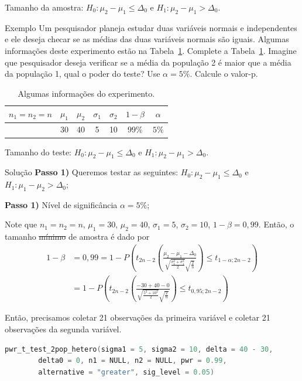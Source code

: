 \documentclass[9pt]{beamer}
\begin{document}
\begin{frame}{Tamanho da amostra: $H_0: \mu_2 - \mu_1 \leq \Delta_0$ e $H_1: \mu_2 - \mu_1 > \Delta_0.$}

\begin{block}{Exemplo}
	Um pesquisador planeja estudar duas variáveis normais e independentes e ele deseja checar se as médias das duas variáveis normais são iguais. Algumas informações deste experimento estão na Tabela~\ref{tab:experimento-h1-upper-sample-size}. Complete a Tabela~\ref{tab:experimento-h1-upper-sample-size}. Imagine que pesquisador deseja verificar se a média da população 2 é maior que a média da população 1, qual o poder do teste? Use $\alpha=5\%$. Calcule o valor-p.
\end{block}

\begin{table}[htbp]
	\centering
	\begin{tabular}{c|c|c|c|c|c|c}
		\toprule[0.05cm]
		$n_1=n_2=n$ & $\mu_1$ & $\mu_2$ & $\sigma_1$ & $\sigma_2$ & $1-\beta$ & $\alpha$ \\ \midrule[0.025cm]
		 & 30 & 40 & 5 & 10 & $99\%$ & $5\%$ \\
		\bottomrule[0.05cm]
	\end{tabular}
	\caption{Algumas informações do experimento.}
	\label{tab:experimento-h1-upper-sample-size}
\end{table}
\end{frame}

\begin{frame}[fragile]{Tamanho do teste: $H_0: \mu_2 - \mu_1 \leq \Delta_0$ e $H_1: \mu_2 - \mu_1 > \Delta_0.$}

\small
\begin{block}{Solução}
	\textbf{Passo 1)} Queremos testar as seguintes: $H_0: \mu_2 - \mu_1 \leq \Delta_0$ e $H_1: \mu_1 - \mu_2 > \Delta_0$;

	\textbf{Passo 1)} Nível de significância $\alpha=5\%$;
	
	Note que $n_1=n_2=n$, $\mu_1=30$, $\mu_2=40$, $\sigma_1=5$, $\sigma_2=10$, $1-\beta = 0,99$.	Então, o tamanho \sout{mínimo} de amostra é dado por
	\begin{align*}
		1- \beta &= 0,99 = 1 - P\left( t_{2n -2}\left( \frac{ \mu_2 - \mu_1 - \Delta_0 }{\sqrt{\frac{\sigma_1^2 + \sigma_1^2}{2}} \sqrt{\frac{2}{n}}} \right) \leq t_{1-\alpha;2n -2} \right)\\
		&= 1 - P\left( t_{2n -2}\left( \frac{ -30 + 40 - 0 }{\sqrt{\frac{5^2 + 10^2}{2}} \sqrt{\frac{2}{n}}} \right) \leq t_{0,95;2n -2} \right)
	\end{align*}	
	
	Então, precisamos coletar 21 observações da primeira variável e coletar 21 observações da segunda variável.
\end{block}

\begin{lstlisting}[language = C, caption = Código no R.]
pwr_t_test_2pop_hetero(sigma1 = 5, sigma2 = 10, delta = 40 - 30,
		delta0 = 0, n1 = NULL, n2 = NULL, pwr = 0.99,
		alternative = "greater", sig_level = 0.05)
\end{lstlisting}

\normalsize
\end{frame}
\end{document}
